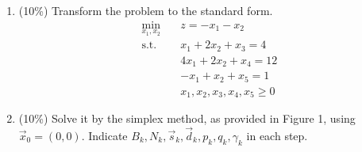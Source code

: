 \documentclass[a4paper,10pt]{article}
\begin{document}
\begin{enumerate}
\begin{enumerate}
        \item (10\%) Transform the problem to the standard form.
        {\color{blue} 
            \begin{equation}
                \begin{aligned}
                    \min_{x_1,x_2} \quad & z = - x_1 - x_2 \\
                    \textrm{s.t.} \quad & x_1 + 2x_2 + x_3 = 4 \\
                        \quad & 4x_1 + 2x_2 + x_4 =  12   \\
                        \quad & -x_1 + x_2 + x_5 = 1  \\
                        \quad & x_1, x_2, x_3, x_4, x_5 \geq 0
                \end{aligned}
            \end{equation}
        }

        \item (10\%) Solve it by the simplex method, as provided in Figure 1, using $\vec{x}_0 = (0, 0)$.
        Indicate $B_k, N_k, \vec{s}_k, \vec{d}_k, p_k, q_k, \gamma_k$ in each step.\
        

\end{enumerate}
\end{enumerate}
\end{document}
